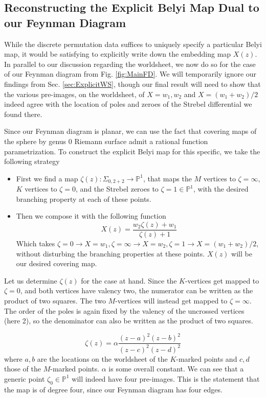 \documentclass[english]{article}
\newcommand\be{\begin{equation}}
\newcommand\ee{\end{equation}}
\renewcommand{\>}{\rangle}
\newcommand{\<}{\langle}
\renewcommand{\(}{\left(}
\renewcommand{\)}{\right)}
\begin{document}
\subsection{Reconstructing the Explicit Belyi Map Dual to our Feynman Diagram}\label{sec:ExplicitBelyi}

While the discrete permutation data suffices to uniquely specify a particular Belyi map, it would be satisfying to explicitly write down the embedding map $X(z)$. In parallel to our discussion regarding the worldsheet, we now do so for the case of our Feynman diagram from Fig. \ref{fig:MainFD}. We will temporarily ignore our findings from Sec. \ref{sec:ExplicitWS}, though our final result will need to show that the various pre-images, on the worldsheet, of $X=w_1,w_2$ and $X=(w_1+w_2)/2$ indeed agree with the location of poles and zeroes of the Strebel differential we found there. 

Since our Feynman diagram is planar, we can use the fact that covering maps of the sphere by genus 0 Riemann surface admit a rational function parametrization. To construct the explicit Belyi map for this specific, we take the following strategy
\begin{itemize}
    \item First we find a map $\zeta(z): \Sigma_{0, 2+2} \to \mathbb{P}^1$, that maps the $M$ vertices to $\zeta =\infty$, $K$ vertices to $\zeta=0$, and the Strebel zeroes to $\zeta =1\in \mathbb{P}^1$, with the desired branching property at each of these points.
    \item Then we compose it with the following function
    \be \label{compose}
    X(z) = \frac{w_2\zeta(z) + w_1}{\zeta(z) +1}
    \ee 
    Which takes $\zeta=0\to X=w_1, \zeta=\infty \to X=w_2, \zeta = 1 \to X= (w_1+w_2)/2$, without disturbing the branching properties at these points. $X(z)$ will be our desired covering map.
\end{itemize}

Let us determine $\zeta(z)$ for the case at hand. Since the $K$-vertices get mapped to $\zeta=0$, and both vertices have valency two, the numerator can be written as the product of two squares. The two $M$-vertices will instead get mapped to $\zeta=\infty$. The order of the poles is again fixed by the valency of the uncrossed vertices (here 2), so the denominator can also be written as the product of two squares.

\begin{equation}
\zeta(z) =\alpha \frac{(z-a)^2 (z-b)^2}{(z-c)^2(z-d)^2} \label{eq:VertexConstraint}
\end{equation}
where $a,b$ are the locations on the worldsheet of the $K$-marked points and $c,d$ those of the $M$-marked points. $\alpha$ is some overall constant. We can see that a generic point $\zeta_{0} \in \mathbb{P}^1$ will indeed have four pre-images. This is the statement that the map is of degree four, since our Feynman diagram has four edges.
\end{document}
